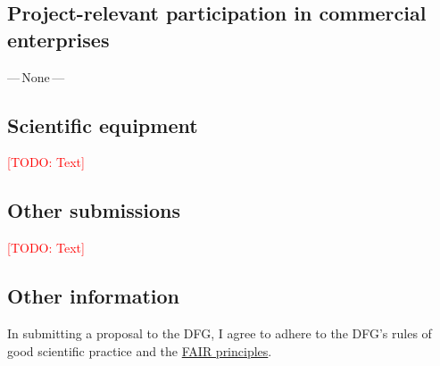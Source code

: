 \documentclass[american,firsttime]{dfgproposal}
\newcommand{\todo}[1]{\xspace{\textcolor{red}{[TODO: #1]}}\xspace}
\begin{document}
	\subsection{Project-relevant participation in commercial enterprises}
	---\,None\,---
	
	\subsection{Scientific equipment}
	\todo{Text}
	
	\subsection{Other submissions}
	\todo{Text}
	
	
	
	\subsection{Other information}
	In submitting a proposal to the DFG, I agree to adhere to the DFG's rules of good scientific practice and the \href{https://www.nature.com/articles/sdata201618}{FAIR principles}.
	
	
\end{document}
